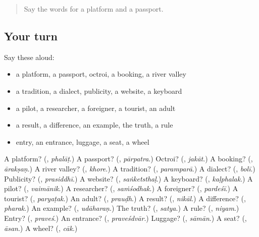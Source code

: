 \label{lesson:MR-R240-second-pass-words-from-chapters-236-240}



\begin{quote}
Say the words for a platform and a passport.
\end{quote}

\subsection*{Your turn}
Say these aloud:

\begin{itemize}
\raggedright
  \item a platform, a passport, octroi, a booking, a river valley
  \item a tradition, a dialect, publicity, a website, a keyboard
  \item a pilot, a researcher, a foreigner, a tourist, an adult
  \item a result, a difference, an example, the truth, a rule
  \item entry, an entrance, luggage, a seat, a wheel
\end{itemize}

\begin{tcolorbox}[breakable,colback=teal!4,colframe=teal!35!black,title={Before you move on}]
A platform? (\textbf{}, \emph{phalāṭ}.) A passport? (\textbf{}, \emph{pārpatra}.) Octroi? (\textbf{}, \emph{jakāt}.) A booking? (\textbf{}, \emph{ārakṣaṇ}.) A river valley? (\textbf{}, \emph{khore}.) A tradition? (\textbf{}, \emph{paramparā}.) A dialect? (\textbf{}, \emph{bolī}.) Publicity? (\textbf{}, \emph{prasiddhī}.) A website? (\textbf{}, \emph{saṅketsthaḷ}.) A keyboard? (\textbf{}, \emph{kaḷphalak}.) A pilot? (\textbf{}, \emph{vaimānik}.) A researcher? (\textbf{}, \emph{saṁśodhak}.) A foreigner? (\textbf{}, \emph{pardeśī}.) A tourist? (\textbf{}, \emph{paryaṭak}.) An adult? (\textbf{}, \emph{prauḍh}.) A result? (\textbf{}, \emph{nikāl}.) A difference? (\textbf{}, \emph{pharak}.) An example? (\textbf{}, \emph{udāharaṇ}.) The truth? (\textbf{}, \emph{satya}.) A rule? (\textbf{}, \emph{niyam}.) Entry? (\textbf{}, \emph{praveś}.) An entrance? (\textbf{}, \emph{praveśdvār}.) Luggage? (\textbf{}, \emph{sāmān}.) A seat? (\textbf{}, \emph{āsan}.) A wheel? (\textbf{}, \emph{cāk}.)
\end{tcolorbox}
